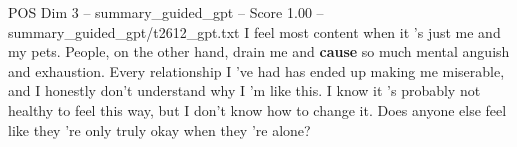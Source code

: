 \begin{textsample}{POS Dim 3 – summary\_guided\_gpt – Score 1.00 – summary\_guided\_gpt/t2612\_gpt.txt}  \label{ex:f3_pos_030}
I feel most content when it ’s just me and my pets.
People, on the other hand, drain me and \textbf{cause} so much mental anguish and exhaustion.
Every relationship I ’ve had has ended up making me miserable, and I honestly don't understand why I ’m like this.
I know it ’s probably not healthy to feel this way, but I don't know how to change it.
Does anyone else feel like they ’re only truly okay when they ’re alone?

\end{textsample}
